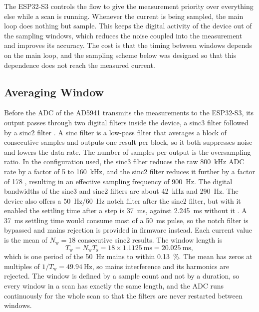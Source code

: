 The ESP32-S3 controls the flow to give the measurement priority over everything else
while a scan is running. Whenever the current is being sampled, the main loop
does nothing but sample. This keeps the
digital activity of the device out of the sampling windows, which reduces the
noise coupled into the measurement and improves its accuracy. The cost is
that the timing between windows depends on the main loop, and the sampling
scheme below was designed so that this dependence does not reach the measured
current. 

\subsection{Averaging Window}
\label{sec:sw_window}

Before the ADC of the AD5941 transmits the measurements to the ESP32-S3, its output
passes through two digital filters inside the device, a sinc3 filter
followed by a sinc2 filter \cite[p.~57]{ad5941_ds}. A sinc filter is a
low-pass filter that averages a block of consecutive samples and outputs
one result per block, so it both suppresses noise and lowers the data rate.
The number of samples per output is the oversampling ratio. In the
configuration used, the sinc3 filter reduces the raw \SI{800}{\kilo\hertz}
ADC rate by a factor of 5 to \SI{160}{\kilo\hertz}, and the sinc2 filter
reduces it further by a factor of 178 \cite[p.~59]{ad5941_ds}, resulting in an effective sampling frequency of \SI{900}{\hertz}. The digital bandwidths of the sinc3 and sinc2 filters are about \SI{42}{\kilo\hertz} and \SI{290}{\hertz}. The device also offers a
\SI{50}{\hertz}/\SI{60}{\hertz} notch filter after the sinc2 filter, but with
it enabled the settling time after a step is \SI{37}{\milli\second}, against
\SI{2.245}{\milli\second} without it \cite[p.~17]{ad5941_ds}. A
\SI{37}{\milli\second} settling time would consume most of a
\SI{50}{\milli\second} pulse, so the notch filter is bypassed and mains
rejection is provided in firmware instead. Each current value is the mean of
$N_\text{w} = 18$ consecutive sinc2 results. The window length is
\begin{equation}
  T_\text{w} = N_\text{w} T_\text{s} = 18 \times \SI{1.1125}{\milli\second}
             = \SI{20.025}{\milli\second},
  \label{eq:sw_window}
\end{equation}
which is one period of the \SI{50}{\hertz} mains to within
\SI{0.13}{\percent}. The mean has zeros at multiples of $1/T_\text{w} = \SI{49.94}{\hertz}$, so mains interference and its harmonics are rejected. The window is defined by a sample count and not by a
duration, so every window in a scan has exactly the same length, and the ADC
runs continuously for the whole scan so that the filters are never restarted
between windows.

